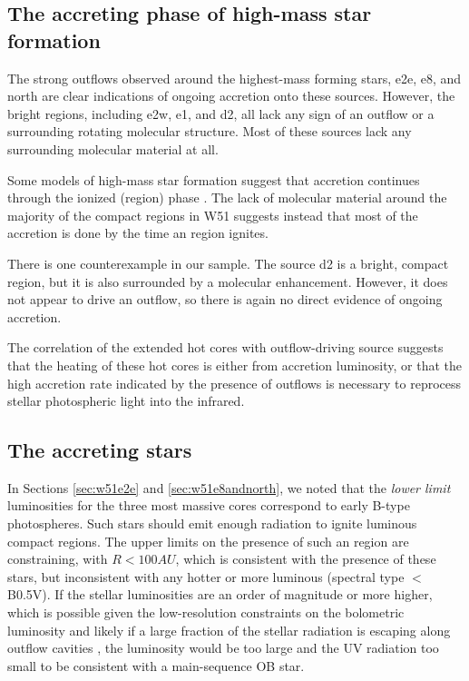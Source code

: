\documentclass{aa}
\begin{document}
\subsection{The accreting phase of high-mass star formation}
\label{sec:accretionandoutflows}
The strong outflows observed around the highest-mass forming stars, e2e, e8,
and north are clear indications of ongoing accretion onto these sources.
However, the bright \hii regions, including e2w, e1, and d2, all lack any sign
of an outflow or a surrounding rotating molecular structure.  Most of these
sources lack any surrounding molecular material at all.

Some models of high-mass star formation suggest that accretion continues
through the ionized (\hii region) phase \citep[e.g.][]{Keto2007a}.  The lack of
molecular material around the majority of the compact \hii regions in W51
suggests instead that most of the accretion is done by the time an \hii region
ignites.

There is one counterexample in our sample.  The source d2 is a bright, compact
\hii region, but it is also surrounded by a molecular enhancement.  However, it
does not appear to drive an outflow, so there is again no direct evidence of
ongoing accretion.

The correlation of the extended hot cores with outflow-driving source suggests
that the heating of these hot cores is either from accretion luminosity, or
that the high accretion rate indicated by the presence of outflows is necessary
to reprocess stellar photospheric light into the infrared.

\subsection{The accreting stars}
\label{sec:stellarproperties}
In Sections \ref{sec:w51e2e} and \ref{sec:w51e8andnorth}, we noted that the
\emph{lower limit} luminosities for the three most massive cores correspond to
early B-type photospheres.  Such stars should emit enough radiation to ignite
luminous compact \hii regions.%
The upper limits on the presence of such an \hii region are constraining, with
$R<100 AU$, which is consistent with the presence of these stars, but
inconsistent with any hotter or more luminous (spectral type $<$B0.5V).
If the stellar luminosities are an order of magnitude or more higher,
which is possible given the low-resolution constraints on the bolometric luminosity
\citep{Ginsburg2016a,Sievers1991a}
and likely if a large fraction of the stellar radiation is escaping along outflow
cavities \citep{Kuiper2012a,Zhang2013h}, the luminosity would be too large and
the UV radiation too small to be consistent with a main-sequence OB star.
\end{document}
